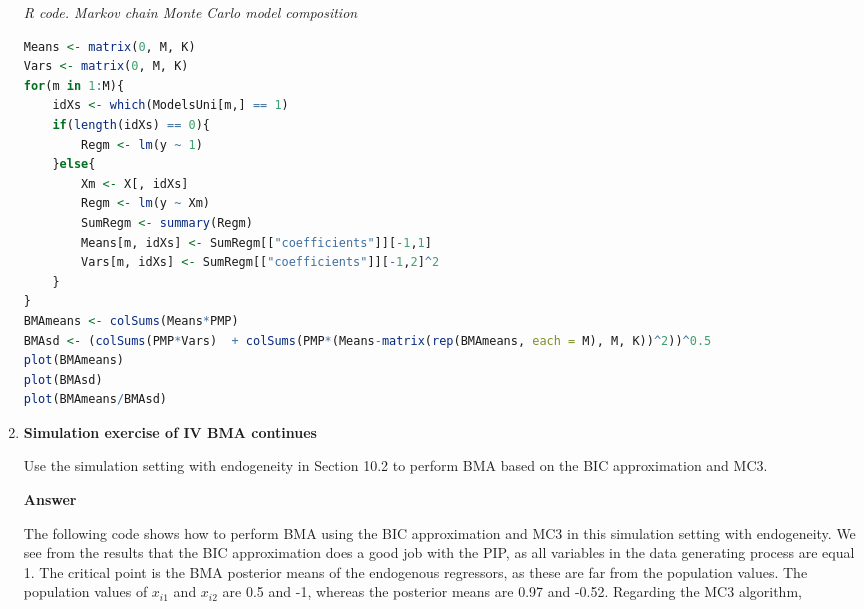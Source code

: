 \begin{enumerate}[leftmargin=*]
\begin{tcolorbox}[enhanced,width=4.67in,center upper,
	fontupper=\large\bfseries,drop shadow southwest,sharp corners]
	\textit{R code. Markov chain Monte Carlo model composition}
	\begin{VF}
		\begin{lstlisting}[language=R]
Means <- matrix(0, M, K)
Vars <- matrix(0, M, K)
for(m in 1:M){
	idXs <- which(ModelsUni[m,] == 1)
	if(length(idXs) == 0){
		Regm <- lm(y ~ 1)
	}else{
		Xm <- X[, idXs]
		Regm <- lm(y ~ Xm)
		SumRegm <- summary(Regm)
		Means[m, idXs] <- SumRegm[["coefficients"]][-1,1]
		Vars[m, idXs] <- SumRegm[["coefficients"]][-1,2]^2 
	}
}
BMAmeans <- colSums(Means*PMP)
BMAsd <- (colSums(PMP*Vars)  + colSums(PMP*(Means-matrix(rep(BMAmeans, each = M), M, K))^2))^0.5 
plot(BMAmeans)
plot(BMAsd)
plot(BMAmeans/BMAsd)
\end{lstlisting}
\end{VF}
\end{tcolorbox}

\item \textbf{Simulation exercise of IV BMA continues}

Use the simulation setting with endogeneity in Section 10.2 to perform BMA based on the BIC approximation and MC3.

\textbf{Answer}

The following code shows how to perform BMA using the BIC approximation and MC3 in this simulation setting with endogeneity. We see from the results that the BIC approximation does a good job with the PIP, as all variables in the data generating process are equal 1. The critical point is the BMA posterior means of the endogenous regressors, as these are far from the population values. The population values of $x_{i1}$ and $x_{i2}$ are 0.5 and -1, whereas the posterior means are 0.97 and -0.52. Regarding the MC3 algorithm, 


\end{enumerate}
